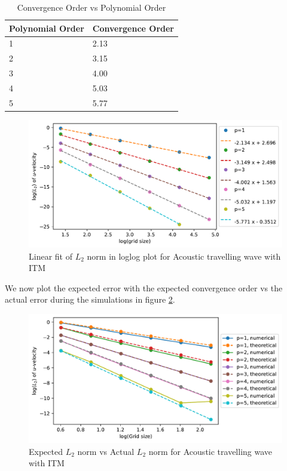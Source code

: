 \begin{center}
\begin{table}[]
    \centering
    \begin{tabular}{|l|l|}
        \hline
     \textbf{Polynomial Order}& \textbf{Convergence Order}  \\
     \hline
     1 & 2.13\\
     \hline
     2 & 3.15 \\
     \hline
     3 & 4.00 \\
     \hline
     4 & 5.03 \\
        \hline
        5 & 5.77\\
        \hline
    \end{tabular}
    \caption{Convergence Order vs Polynomial Order}
    \label{table:convergenceorder}
    \end{table}
\end{center}

\begin{figure}
    \centering
    \includegraphics[width=\linewidth]{figures/error2.pdf}
    \caption{Linear fit of $L_2$ norm in loglog plot for Acoustic travelling wave with \ac{ITM}}
    \label{fig:convergenceorder}
\end{figure}

We now plot the expected error with the expected convergence order vs the actual error during the simulations in figure \ref{fig:expectedvsactualerror}.

\begin{figure}
    \centering
    \includegraphics[width=\linewidth]{figures/error3.pdf}
    \caption{Expected $L_2$ norm vs Actual $L_2$ norm for Acoustic travelling wave with \ac{ITM}}
    \label{fig:expectedvsactualerror}
\end{figure}

